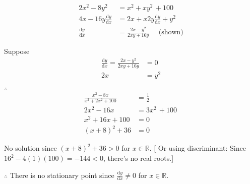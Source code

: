 \item {}
\begin{align*}
2x^{2}-8y^{2} & =x^{2}+xy^{2}\,+100\\
4x-16y\frac{\text{d}y}{\text{d}x} & =2x+x2y\frac{\text{d}y}{\text{d}x}+y^{2}\\
\frac{\text{d}y}{\text{d}x} & =\frac{2x-y^{2}}{2xy+16y}\,\,\,\,\,\,\,\,\text{(shown)}
\end{align*}
 

Suppose 
\begin{align*}
\frac{\text{d}y}{\text{d}x}=\frac{2x-y^{2}}{2xy+16y} & =0\\
2x & =y^{2}
\end{align*}

$\therefore$
\begin{align*}
\frac{x^{2}-8x}{x^{2}+2x^{2}+100} & =\frac{1}{2}\\
2x^{2}-16x & =3x^{2}\,+100\,\\
x^{2}+16x+100 & =0\\
\left(x+8\right)^{2}+36 & =0
\end{align*}

No solution since $\left(x+8\right)^{2}+36>0$ for $x\in\mathbb{R}$.
{[} Or using discriminant: Since $16^{2}-4\left(1\right)\left(100\right)=-144<0$,
there\textquoteright s no real roots.{]} 

$\therefore$ There is no stationary point since $\frac{\text{d}y}{\text{d}x}\ne0$
for $x\in\mathbb{R}$.